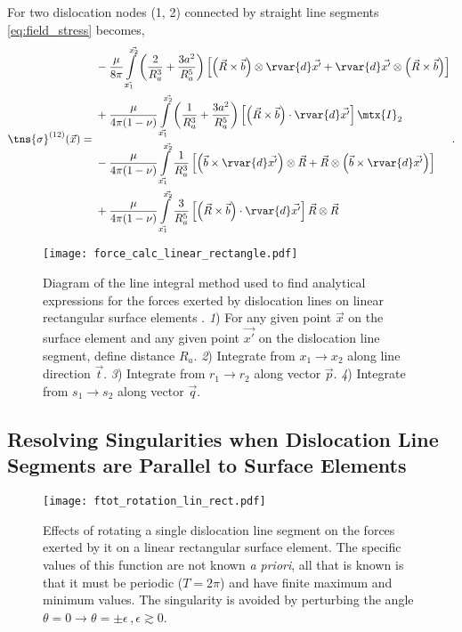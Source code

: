 For two dislocation nodes (1, 2) connected by straight line segments \cref{eq:field_stress} becomes,
\begin{align}\label{eq:two_node_stress_field}
  \tns{\sigma}^{(12)}(\vec{x}) =
  \begin{split}
    &-\dfrac{\mu}{8\pi} \int\limits_{\vec{x_{1}}}^{\vec{x_{2}}} \left( \dfrac{2}{R_{a}^{3}} + \dfrac{3 a^{2}}{R_{a}^{5}} \right) \left[ \left( \vec{R} \times \vec{b} \right) \otimes \rvar{d}\vec{x'} + \rvar{d}\vec{x'} \otimes \left( \vec{R} \times \vec{b} \right) \right]\\
    &+ \dfrac{\mu}{4\pi (1 - \nu)} \int\limits_{\vec{x_{1}}}^{\vec{x_{2}}} \left( \dfrac{1}{R_{a}^{3}} + \dfrac{3 a^{2}}{R_{a}^{5}} \right) \left[ \left(\vec{R} \times \vec{b}\right)\cdot \rvar{d}\vec{x'} \right] \mtx{I}_{2}\\
    &- \dfrac{\mu}{4\pi (1 - \nu)} \int\limits_{\vec{x_{1}}}^{\vec{x_{2}}} \dfrac{1}{R_{a}^{3}} \left[ \left(\vec{b} \times \rvar{d}\vec{x'}\right) \otimes \vec{R} + \vec{R} \otimes \left(\vec{b} \times \rvar{d}\vec{x'}\right) \right]\\
    &+ \dfrac{\mu}{4\pi (1 - \nu)} \int\limits_{\vec{x_{1}}}^{\vec{x_{2}}} \dfrac{3}{R_{a}^{5}} \left[ \left( \vec{R} \times \vec{b} \right) \cdot \rvar{d}\vec{x'} \right]\vec{R} \otimes \vec{R}
  \end{split}\,.
\end{align}
\begin{figure}
  \centering
  \texttt{[image: force\_calc\_linear\_rectangle.pdf]}
  \caption[Diagram of the analytical force calculation on linear rectangular surface elements.]{Diagram of the line integral method used to find analytical expressions for the forces exerted by dislocation lines on linear rectangular surface elements \cite{analytic_tractions}.
    \textit{1}) For any given point $ \vec{x} $ on the surface element and any given point $ \vec{x'}$ on the dislocation line segment, define distance $ R_{a} $.
    \textit{2}) Integrate from $ x_{1} \to x_{2} $ along line direction $ \vec{t} $.
    \textit{3}) Integrate from $ r_{1} \to r_{2} $ along vector $ \vec{p} $.
    \textit{4}) Integrate from $ s_{1} \to s_{2} $ along vector $ \vec{q} $.}
  \label{f:flrs}
\end{figure}
\subsection{Resolving Singularities when Dislocation Line Segments are Parallel to Surface Elements}
\label{ss:par_dln_se}
%
\begin{figure}
  \centering
  \texttt{[image: ftot\_rotation\_lin\_rect.pdf]}
  \caption[Avoiding singularities by rotating dislocation line segments.]{Effects of rotating a single dislocation line segment on the forces exerted by it on a linear rectangular surface element. The specific values of this function are not known \emph{a priori}, all that is known is that it must be periodic ($ T = 2\pi$) and have finite maximum and minimum values. The singularity is avoided by perturbing the angle $ \theta = 0 \to \theta = \pm \epsilon\,, \epsilon \gtrsim 0 $.}
  \label{f:rflrs}
\end{figure}
%
\savearabiccounter